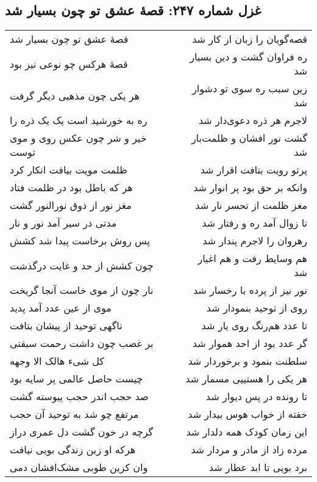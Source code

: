 \begin{center}
\section*{غزل شماره ۲۴۷: قصهٔ عشق تو چون بسیار شد}
\label{sec:247}
\begin{longtable}{l p{0.5cm} r}
قصهٔ عشق تو چون بسیار شد
&&
قصه‌گویان را زبان از کار شد
\\
قصهٔ هرکس چو نوعی نیز بود
&&
ره فراوان گشت و دین بسیار شد
\\
هر یکی چون مذهبی دیگر گرفت
&&
زین سبب ره سوی تو دشوار شد
\\
ره به خورشید است یک یک ذره را
&&
لاجرم هر ذره دعوی‌دار شد
\\
خیر و شر چون عکس روی و موی توست
&&
گشت نور افشان و ظلمت‌بار شد
\\
ظلمت مویت بیافت انکار کرد
&&
پرتو رویت بتافت اقرار شد
\\
هر که باطل بود در ظلمت فتاد
&&
وانکه بر حق بود پر انوار شد
\\
مغز نور از ذوق نورالنور گشت
&&
مغز ظلمت از تحسر نار شد
\\
مدتی در سیر آمد نور و نار
&&
تا زوال آمد ره و رفتار شد
\\
پس روش برخاست پیدا شد کشش
&&
رهروان را لاجرم پندار شد
\\
چون کشش از حد و غایت درگذشت
&&
هم وسایط رفت و هم اغیار شد
\\
نار چون از موی خاست آنجا گریخت
&&
نور نیز از پرده با رخسار شد
\\
موی از عین عدد آمد پدید
&&
روی از توحید بنمودار شد
\\
ناگهی توحید از پیشان بتافت
&&
تا عدد هم‌رنگ روی یار شد
\\
بر غضب چون داشت رحمت سبقتی
&&
گر عدد بود از احد هموار شد
\\
کل شیء هالک الا وجهه
&&
سلطنت بنمود و برخوردار شد
\\
چیست حاصل عالمی پر سایه بود
&&
هر یکی را هستییی مسمار شد
\\
صد حجب اندر حجب پیوسته گشت
&&
تا رونده در پس دیوار شد
\\
مرتفع چو شد به توحید آن حجب
&&
خفته از خواب هوس بیدار شد
\\
گرچه در خون گشت دل عمری دراز
&&
این زمان کودک همه دلدار شد
\\
هرکه او زین زندگی بویی نیافت
&&
مرده زاد از مادر و مردار شد
\\
وان کزین طوبی مشک‌افشان دمی
&&
برد بویی تا ابد عطار شد
\\
\end{longtable}
\end{center}
